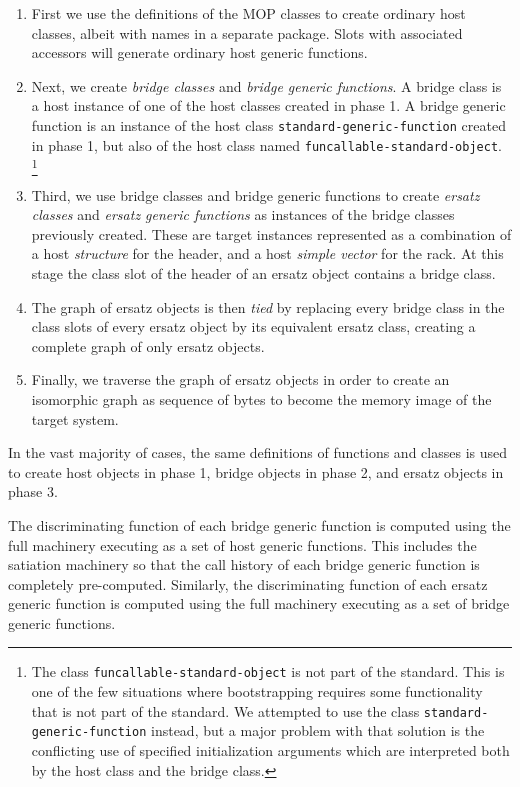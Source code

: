 \begin{enumerate}
\item First we use the definitions of the MOP classes to create
  ordinary host classes, albeit with names in a separate package.
  Slots with associated accessors will generate ordinary host generic
  functions. 
\item Next, we create \emph{bridge classes} and \emph{bridge generic
  functions}.  A bridge class is a host instance of one of the host
  classes created in phase 1.  A bridge generic function is an
  instance of the host class \texttt{standard-generic-function}
  created in phase 1, but also of the host class named
  \texttt{funcallable-standard-object}.%
  \footnote{The class \texttt{funcallable-standard-object} is not part
    of the \cl{} standard.  This is one of the few situations where
    bootstrapping \sicl{} requires some functionality that is not part
    of the standard.  We attempted to use the class
    \texttt{standard-generic-function} instead, but a major problem
    with that solution is the conflicting use of specified
    initialization arguments which are interpreted both by the host
    class and the bridge class.}
\item Third, we use bridge classes and bridge generic functions to
  create \emph{ersatz classes} and \emph{ersatz generic functions} as
  instances of the bridge classes previously created.  These are
  target instances represented as a combination of a host
  \emph{structure} for the header, and a host \emph{simple vector} for
  the rack.  At this stage the class slot of the header of an ersatz
  object contains a bridge class.
\item The graph of ersatz objects is then \emph{tied} by
  replacing every bridge class in the class slots of every ersatz
  object by its equivalent ersatz class, creating a complete graph of
  only ersatz objects. 
\item Finally, we traverse the graph of ersatz objects in order to
  create an isomorphic graph as sequence of bytes to become the memory
  image of the target system.
\end{enumerate}

In the vast majority of cases, the same definitions of functions and
classes is used to create host objects in phase 1, bridge objects in
phase 2, and ersatz objects in phase 3. 

The discriminating function of each bridge generic function is
computed using the full machinery executing as a set of host generic
functions.  This includes the satiation machinery so that the call
history of each bridge generic function is completely pre-computed.
Similarly, the discriminating function of each ersatz generic function
is computed using the full machinery executing as a set of bridge
generic functions.  

